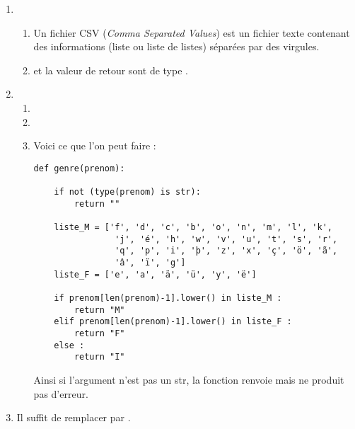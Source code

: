 \documentclass[a4paper,12pt,french]{article}
\begin{document}
\exo{}

\begin{enumerate}[\bfseries 1.]
	\item 	\begin{enumerate}[\bfseries a.]
            	\item 	Un fichier CSV (\textit{Comma Separated Values}) est un fichier texte contenant des informations (liste ou liste de listes) séparées par des virgules.
            	\item 	{} et la valeur de retour sont de type .
            \end{enumerate}
	\item 	 \begin{enumerate}[\bfseries a.]
            	\item 	{}
            	\item 	{}
                \item 	Voici ce que l'on peut faire :
\begin{verbatim}
def genre(prenom):

    if not (type(prenom) is str):
        return ""

    liste_M = ['f', 'd', 'c', 'b', 'o', 'n', 'm', 'l', 'k',
                'j', 'é', 'h', 'w', 'v', 'u', 't', 's', 'r',
                'q', 'p', 'i', 'þ', 'z', 'x', 'ç', 'ö', 'ã',
                'â', 'ï', 'g']
    liste_F = ['e', 'a', 'ä', 'ü', 'y', 'ë']

    if prenom[len(prenom)-1].lower() in liste_M :
        return "M"
    elif prenom[len(prenom)-1].lower() in liste_F :
        return "F"
    else :
        return "I"                        
\end{verbatim}
Ainsi si l'argument n'est pas un str, la fonction renvoie  mais ne produit pas d'erreur.
\end{enumerate}
\item Il suffit de remplacer  par .
\end{enumerate}
\end{document}

